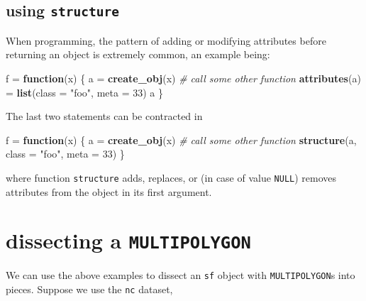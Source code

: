 \documentclass[]{book}
\newenvironment{Shaded}{\begin{snugshade}}{\end{snugshade}}
\newcommand{\CommentTok}[1]{\textcolor[rgb]{0.56,0.35,0.01}{\textit{#1}}}
\newcommand{\ControlFlowTok}[1]{\textcolor[rgb]{0.13,0.29,0.53}{\textbf{#1}}}
\newcommand{\DataTypeTok}[1]{\textcolor[rgb]{0.13,0.29,0.53}{#1}}
\newcommand{\DecValTok}[1]{\textcolor[rgb]{0.00,0.00,0.81}{#1}}
\newcommand{\KeywordTok}[1]{\textcolor[rgb]{0.13,0.29,0.53}{\textbf{#1}}}
\newcommand{\NormalTok}[1]{#1}
\newcommand{\StringTok}[1]{\textcolor[rgb]{0.31,0.60,0.02}{#1}}
\begin{document}
\hypertarget{using-structure}{%
\subsection*{\texorpdfstring{using \texttt{structure}}{using structure}}\label{using-structure}}

When programming, the pattern of adding or modifying attributes before returning
an object is extremely common, an example being:

\begin{Shaded}
\begin{Highlighting}[]
\NormalTok{f =}\StringTok{ }\ControlFlowTok{function}\NormalTok{(x) \{}
\NormalTok{   a =}\StringTok{ }\KeywordTok{create_obj}\NormalTok{(x) }\CommentTok{# call some other function}
   \KeywordTok{attributes}\NormalTok{(a) =}\StringTok{ }\KeywordTok{list}\NormalTok{(}\DataTypeTok{class =} \StringTok{"foo"}\NormalTok{, }\DataTypeTok{meta =} \DecValTok{33}\NormalTok{)}
\NormalTok{   a}
\NormalTok{\}}
\end{Highlighting}
\end{Shaded}

The last two statements can be contracted in

\begin{Shaded}
\begin{Highlighting}[]
\NormalTok{f =}\StringTok{ }\ControlFlowTok{function}\NormalTok{(x) \{}
\NormalTok{   a =}\StringTok{ }\KeywordTok{create_obj}\NormalTok{(x) }\CommentTok{# call some other function}
   \KeywordTok{structure}\NormalTok{(a, }\DataTypeTok{class =} \StringTok{"foo"}\NormalTok{, }\DataTypeTok{meta =} \DecValTok{33}\NormalTok{)}
\NormalTok{\}}
\end{Highlighting}
\end{Shaded}

where function \texttt{structure} adds, replaces, or (in case of value \texttt{NULL}) removes
attributes from the object in its first argument.

\hypertarget{dissecting-a-multipolygon}{%
\section*{\texorpdfstring{dissecting a \texttt{MULTIPOLYGON}}{dissecting a MULTIPOLYGON}}\label{dissecting-a-multipolygon}}

We can use the above examples to dissect an \texttt{sf} object with
\texttt{MULTIPOLYGON}s into pieces. Suppose we use the \texttt{nc} dataset,
\end{document}
